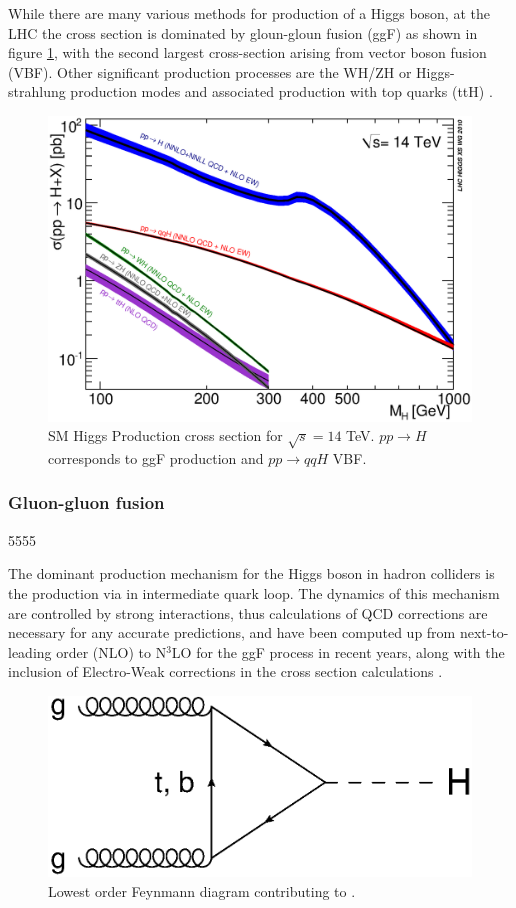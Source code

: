 		While there are many various methods for production of a Higgs boson, at the LHC the cross section is dominated by gloun-gloun fusion (ggF) as shown in figure \ref{fig:higgsproductionCS}, with the second largest cross-section arising from vector boson fusion (VBF). Other significant production processes are the WH/ZH or Higgs-strahlung production modes and associated production with top quarks (ttH) \cite{LHCHiggsCS}. 
		
			\begin{figure}[h]
				\centering
				\includegraphics[width=0.7\linewidth]{T/FIGS/YRHXS_Summary_fig3}
				\caption{SM Higgs Production cross section for $\sqrt{s}=14$ TeV. $pp\rightarrow H$ corresponds to ggF production and $pp\rightarrow qqH$ VBF. \cite{LHCHiggsCS}}
				\label{fig:higgsproductionCS}
			\end{figure}
		
		\subsubsection{Gluon-gluon fusion}5555
		
		The dominant production mechanism for the Higgs boson in hadron colliders is the \ggF production via in intermediate quark loop. The dynamics of this mechanism are controlled by strong interactions, thus calculations of QCD corrections are necessary for any accurate predictions, and have been computed up from next-to-leading order (NLO) to N$^3$LO for the ggF process in recent years, along with the inclusion of Electro-Weak corrections in the cross section calculations \cite{LHCHiggsCS}. 
		
			\begin{figure}[h]
			\centering
			\includegraphics[width=0.4\linewidth]{T/FIGS/ggF}
			\caption{Lowest order Feynmann diagram contributing to \ggF.}
			\label{fig:ggf}
			\end{figure}
			
